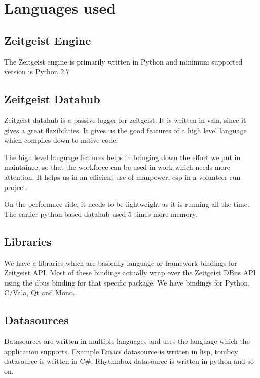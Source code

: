 \section{Languages used}

\subsection{Zeitgeist Engine}
The Zeitgeist engine is primarily written in Python and minimum supported version is Python 2.7


\subsection{Zeitgeist Datahub}
Zeitgeist datahub is a passive logger for zeitgeist. It is written in 
vala, since it gives a great flexibilities. It gives us the good features 
of a high level language which compiles down to native code. 

The high level language features helps in bringing down the effort we
put in maintaince, so that the workforce can be used in work which needs 
more attention. It helps us in an efficient use of manpower, esp in a 
volunteer run project.

On the performace side, it needs to be lightweight as it is running all 
the time. The earlier python based datahub used 5 times more memory.

\subsection{Libraries}
We have a libraries which are basically language or framework bindings 
for Zeitgeist API. Most of these bindings actually wrap over the 
Zeitgeist DBus API using the dbus binding for that specific package. 
We have bindings for Python, C/Vala, Qt and Mono.
\subsection{Datasources}
Datasources are written in multiple languages and uses the language which 
the application supports. Example Emacs datasource is written in lisp, 
tomboy datasource is written in C\#, Rhythmbox datasource is written in 
python and so on.
